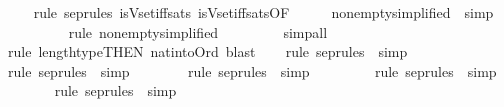 \begin{isabellebody}
\ \ \ \isamarkupfalse%
\ {\isacharparenleft}{\kern0pt}rule\ sep{\isacharunderscore}{\kern0pt}rules\ is{\isacharunderscore}{\kern0pt}Vset{\isacharunderscore}{\kern0pt}iff{\isacharunderscore}{\kern0pt}sats\ is{\isacharunderscore}{\kern0pt}Vset{\isacharunderscore}{\kern0pt}iff{\isacharunderscore}{\kern0pt}sats{\isacharbrackleft}{\kern0pt}OF\ {\isacharunderscore}{\kern0pt}\ {\isacharunderscore}{\kern0pt}\ {\isacharunderscore}{\kern0pt}\ {\isacharunderscore}{\kern0pt}\ {\isacharunderscore}{\kern0pt}\ nonempty{\isacharbrackleft}{\kern0pt}simplified{\isacharbrackright}{\kern0pt}{\isacharbrackright}{\kern0pt}\ {\isacharbar}{\kern0pt}\ simp{\isacharparenright}{\kern0pt}{\isacharplus}{\kern0pt}\isanewline
\ \ \ \ \ \ \ \ \isamarkupfalse%
\ {\isacharparenleft}{\kern0pt}rule\ nonempty{\isacharbrackleft}{\kern0pt}simplified{\isacharbrackright}{\kern0pt}{\isacharparenright}{\kern0pt}\isanewline
\ \ \ \ \ \ \ \isamarkupfalse%
\ {\isacharparenleft}{\kern0pt}simp{\isacharunderscore}{\kern0pt}all{\isacharparenright}{\kern0pt}\isanewline
\ \ \ \ \isamarkupfalse%
\ {\isacharparenleft}{\kern0pt}rule\ length{\isacharunderscore}{\kern0pt}type{\isacharbrackleft}{\kern0pt}THEN\ nat{\isacharunderscore}{\kern0pt}into{\isacharunderscore}{\kern0pt}Ord{\isacharbrackright}{\kern0pt}{\isacharcomma}{\kern0pt}\ blast{\isacharparenright}{\kern0pt}{\isacharplus}{\kern0pt}\isanewline
\ \ \isamarkupfalse%
\ {\isacharparenleft}{\kern0pt}{\isacharparenleft}{\kern0pt}rule\ sep{\isacharunderscore}{\kern0pt}rules\ {\isacharbar}{\kern0pt}\ simp{\isacharparenright}{\kern0pt}{\isacharparenright}{\kern0pt}\isanewline
\ \ \ \ \isamarkupfalse%
\ {\isacharparenleft}{\kern0pt}{\isacharparenleft}{\kern0pt}rule\ sep{\isacharunderscore}{\kern0pt}rules\ {\isacharbar}{\kern0pt}\ simp{\isacharparenright}{\kern0pt}{\isacharparenright}{\kern0pt}\isanewline
\ \ \ \ \ \ \isamarkupfalse%
\ {\isacharparenleft}{\kern0pt}{\isacharparenleft}{\kern0pt}rule\ sep{\isacharunderscore}{\kern0pt}rules\ {\isacharbar}{\kern0pt}\ simp{\isacharparenright}{\kern0pt}{\isacharparenright}{\kern0pt}\isanewline
\ \ \ \ \ \ \ \isamarkupfalse%
\ {\isacharparenleft}{\kern0pt}{\isacharparenleft}{\kern0pt}rule\ sep{\isacharunderscore}{\kern0pt}rules\ {\isacharbar}{\kern0pt}\ simp{\isacharparenright}{\kern0pt}{\isacharparenright}{\kern0pt}\isanewline
\ \ \ \ \ \ \isamarkupfalse%
\ {\isacharparenleft}{\kern0pt}{\isacharparenleft}{\kern0pt}rule\ sep{\isacharunderscore}{\kern0pt}rules\ {\isacharbar}{\kern0pt}\ simp{\isacharparenright}{\kern0pt}{\isacharparenright}{\kern0pt}\isanewline

\end{isabellebody}
